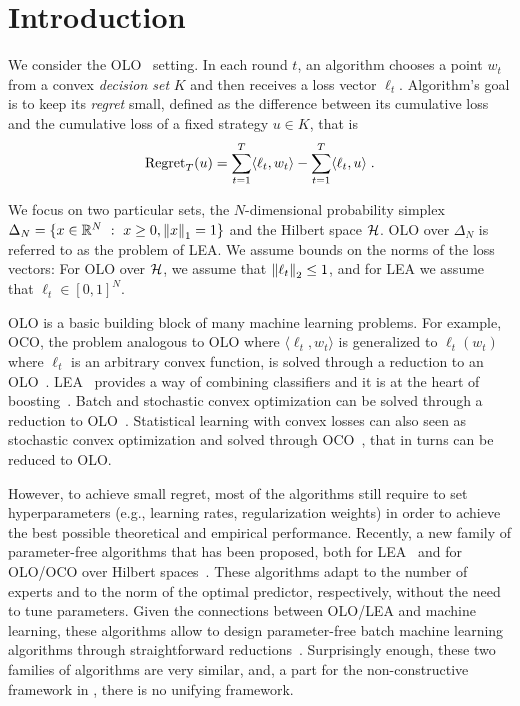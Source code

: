 \section{Introduction}
\label{section:introduction}

We consider the \ac{OLO}~\citep{Cesa-Bianchi-Lugosi-2006,
Shalev-Shwartz-2011} setting. In each round $t$, an algorithm chooses a point
$w_t$ from a convex \emph{decision set} $K$ and then receives a loss vector
$\ell_t$. Algorithm's goal is to keep its \emph{regret} small, defined as the
difference between its cumulative loss and the cumulative loss of a fixed
strategy $u \in K$, that is
$$
\operatorname{Regret}_T(u) = \sum_{t=1}^T \langle \ell_t, w_t \rangle - \sum_{t=1}^T \langle \ell_t, u \rangle \; .
$$

We focus on two particular sets, the $N$-dimensional probability simplex
$\Delta_N = \{ x \in \mathbb{R}^N ~:~ x \ge 0, \left\|{x}\right\|_1 = 1\}$ and the Hilbert space
$\mathcal{H}$.  \ac{OLO} over $\Delta_N$ is referred to as the problem of \ac{LEA}.  We
assume bounds on the norms of the loss vectors: For \ac{OLO} over $\mathcal{H}$, we
assume that $\left\|{\ell_t}\right\|_2 \le 1$, and for \ac{LEA} we assume that
$\ell_t \in [0,1]^N$.

\ac{OLO} is a basic building block of many machine learning problems. For
example, \ac{OCO}, the problem analogous to \ac{OLO} where $\langle \ell_t, w_t \rangle$ is
generalized to $\ell_t(w_t)$ where $\ell_t$ is an arbitrary convex function, is
solved through a reduction to an \ac{OLO}~\citep{Shalev-Shwartz-2011}.
\ac{LEA}~\citep{Littlestone-Warmuth-1994, Vovk-1998,
Cesa-Bianchi-Freund-Haussler-Helmbold-Schapire-Warmuth-1997} provides a way of
combining classifiers and it is at the heart of
boosting~\citep{Freund-Schapire-1997}. Batch and stochastic convex optimization
can be solved through a reduction to \ac{OLO}~\citep{Shalev-Shwartz-2011}.
Statistical learning with convex losses can also seen as stochastic convex
optimization and solved through \ac{OCO}~\citep{Munro-1951}, that in turns can be reduced to \ac{OLO}.

However, to achieve small regret, most of the algorithms still require to set
hyperparameters (e.g., learning rates, regularization weights) in
order to achieve the best possible theoretical and empirical performance.
Recently, a new family of parameter-free algorithms that has been proposed, both for \ac{LEA}~\citep{Chaudhuri-Freund-Hsu-2009,
Chernov-Vovk-2010, Luo-Schapire-2014, Luo-Schapire-2015, Koolen-van-Erven-2015}
and for \ac{OLO}/\ac{OCO} over Hilbert spaces~\citep{Streeter-McMahan-2012,
Orabona-2013, McMahan-Abernethy-2013, McMahan-Orabona-2014, Orabona-2014}.
These algorithms adapt to the number of experts and to the norm of the optimal
predictor, respectively, without the need to tune parameters. Given the
connections between \ac{OLO}/\ac{LEA} and machine learning, these algorithms
allow to design parameter-free batch machine learning algorithms through
straightforward reductions~\citep{Orabona-2014,Luo-Schapire-2015}.
Surprisingly enough, these two families of algorithms are very similar, and, a part for the non-constructive framework in \cite{Foster-Rakhlin-Sridharan-2015}, there is no unifying framework.


